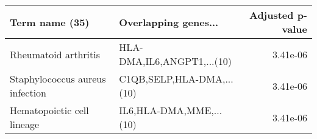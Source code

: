 \begin{tabular}{llr}
\toprule
                 Term name (35) &       Overlapping genes... &  Adjusted p-value \\
\midrule
           Rheumatoid arthritis & HLA-DMA,IL6,ANGPT1,...(10) &          3.41e-06 \\
Staphylococcus aureus infection &  C1QB,SELP,HLA-DMA,...(10) &          3.41e-06 \\
     Hematopoietic cell lineage &    IL6,HLA-DMA,MME,...(10) &          3.41e-06 \\
\bottomrule
\end{tabular}
